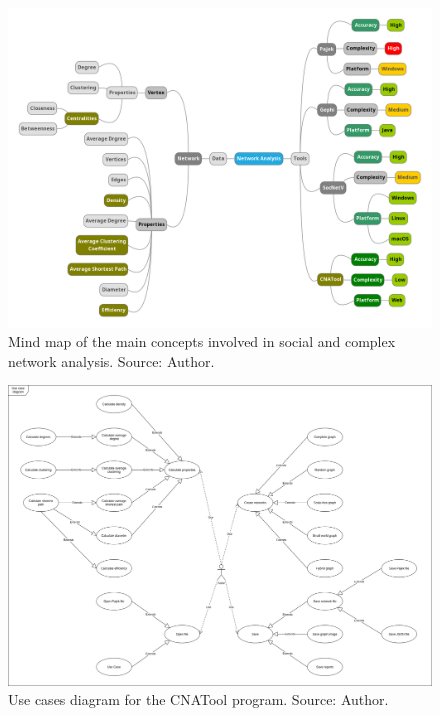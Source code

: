 \documentclass[preprint,12pt, a4paper]{elsarticle}
\begin{document}
\begin{figure}[!htbp]
    \begin{center}
        \includegraphics[scale=0.3]{images/mindmap.png}
    \end{center}
    \caption{Mind map of the main concepts involved in social and complex network analysis. Source: Author.}
    \label{fig:mindmap}
\end{figure}

\begin{figure}[!htbp]
    \begin{center}
        \includegraphics[scale=0.25]{images/use-case.png}
    \end{center}
    \caption{Use cases diagram for the CNATool program. Source: Author.}
    \label{fig:usecase}
\end{figure}
\end{document}
